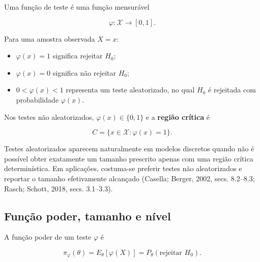 \documentclass[
  letterpaper,
  DIV=11,
  numbers=noendperiod]{scrreprt}
\providecommand{\tightlist}{%
  \setlength{\itemsep}{0pt}\setlength{\parskip}{0pt}}\usepackage{longtable,booktabs,array}
\begin{document}
\begin{tcolorbox}[enhanced jigsaw, colback=white, leftrule=.75mm, colbacktitle=quarto-callout-note-color!10!white, breakable, titlerule=0mm, bottomtitle=1mm, title=\textcolor{quarto-callout-note-color}{\faInfo}\hspace{0.5em}{Definição: função de teste}, colframe=quarto-callout-note-color-frame, toprule=.15mm, opacityback=0, bottomrule=.15mm, opacitybacktitle=0.6, arc=.35mm, toptitle=1mm, rightrule=.15mm, coltitle=black, left=2mm]

Uma função de teste é uma função mensurável

\[\varphi:\mathcal{X}\longrightarrow[0,1].\]

Para uma amostra observada \(X=x\):

\begin{itemize}
\tightlist
\item
  \(\varphi(x)=1\) significa rejeitar \(H_0\);
\item
  \(\varphi(x)=0\) significa não rejeitar \(H_0\);
\item
  \(0<\varphi(x)<1\) representa um teste aleatorizado, no qual \(H_0\) é
  rejeitada com probabilidade \(\varphi(x)\).
\end{itemize}

Nos testes não aleatorizados, \(\varphi(x)\in\{0,1\}\) e a
\textbf{região crítica} é

\[C=\{x\in\mathcal{X}:\varphi(x)=1\}.\]

\end{tcolorbox}

Testes aleatorizados aparecem naturalmente em modelos discretos quando
não é possível obter exatamente um tamanho prescrito apenas com uma
região crítica determinística. Em aplicações, costuma-se preferir testes
não aleatorizados e reportar o tamanho efetivamente alcançado (Casella;
Berger, 2002, secs. 8.2--8.3; Rasch; Schott, 2018, secs. 3.1--3.3).

\subsection{Função poder, tamanho e
nível}\label{funuxe7uxe3o-poder-tamanho-e-nuxedvel}

\begin{tcolorbox}[enhanced jigsaw, colback=white, leftrule=.75mm, colbacktitle=quarto-callout-note-color!10!white, breakable, titlerule=0mm, bottomtitle=1mm, title=\textcolor{quarto-callout-note-color}{\faInfo}\hspace{0.5em}{Definição: função poder}, colframe=quarto-callout-note-color-frame, toprule=.15mm, opacityback=0, bottomrule=.15mm, opacitybacktitle=0.6, arc=.35mm, toptitle=1mm, rightrule=.15mm, coltitle=black, left=2mm]

A função poder de um teste \(\varphi\) é

\[\pi_\varphi(\theta)
=E_\theta[\varphi(X)]
=P_\theta(\text{rejeitar }H_0).\]

\end{tcolorbox}
\end{document}
